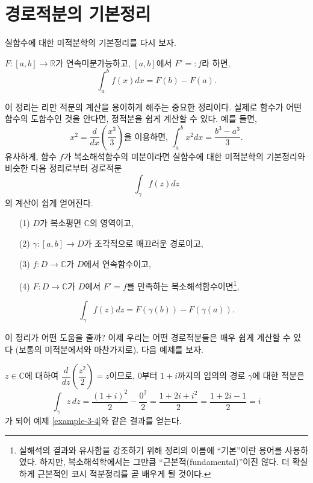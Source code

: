\section{경로적분의 기본정리}

실함수에 대한 미적분학의 기본정리를 다시 보자.
\begin{salttheorem}{}{} \label{thm-3-2}
$F:[a,b] \to \mathbb R$가 연속미분가능하고, 
$[a,b]$에서 $F'=:f$라 하면,
\[
\int_a^b f(x)dx = F(b) - F(a).
\]
\end{salttheorem}

이 정리는 리만 적분의 계산을 용이하게 해주는 중요한 정리이다. 
실제로 함수가 어떤 함수의 도함수인 것을 안다면, 정적분을 쉽게 계산할 수 있다.
예를 들면,
\[
x^2 = \dfrac d{dx}\left( \dfrac{x^3}3\right) \text{을 이용하면, }
\int_a^b x^2 dx = \dfrac{b^3-a^3}3.
\]
유사하게,  함수 $f$가 복소해석함수의 미분이라면 
실함수에 대한 미적분학의 기본정리와 비슷한 다음 정리로부터 
경로적분
\[
\int_\gamma f(z)dz
\]
의 계산이 쉽게 얻어진다.


\begin{salttheorem}  {}{}
\label{thm-3-3}
\begin{itemize}
\item[(1)] $D$가 복소평면 $\mathbb C$의 영역이고,
\item[(2)] $\gamma : [a,b] \to D$가 조각적으로 매끄러운 경로이고,
\item[(3)] $f:D\to\mathbb C$가 $D$에서 연속함수이고,
\item[(4)] $F:D\to \mathbb C$가 $D$에서 $F'=f$를 만족하는 
복소해석함수이면\footnote{실해석의 결과와 유사함을 강조하기 위해  정리의 이름에
``기본''이란 용어를 사용하였다. 하지만, 복소해석학에서는
그만큼 ``근본적(fundamental)''이진 않다. 
더 확실하게 근본적인 코시 적분정리를 곧 배우게 될 것이다. },
\end{itemize}
\[
\int_\gamma f(z)dz = F(\gamma(b)) - F(\gamma(a)).
\]
\end{salttheorem}

이 정리가 어떤 도움을 줄까?
이제 우리는 어떤 경로적분들은 매우 쉽게 계산할 수 있다
(보통의 미적분에서와 마찬가지로).
다음 예제를 보자.

\begin{saltexample}[label=example-3-5]{}{}
$z\in\mathbb C$에 대하여
$\dfrac d{dz}\left( \dfrac{z^2}2\right)=z$이므로,
$0$부터 $1+i$까지의 임의의 경로 $\gamma$에 대한 적분은
\[
\int_\gamma z\, dz = \dfrac{(1+i)^2}2 - \dfrac{0^2}2 
= \dfrac{1+2i+i^2}2 = \dfrac{1+2i-1}2 = i
\]
가 되어 예제 \ref{example-3-4}와 같은 결과를 얻는다.
\end{saltexample}

